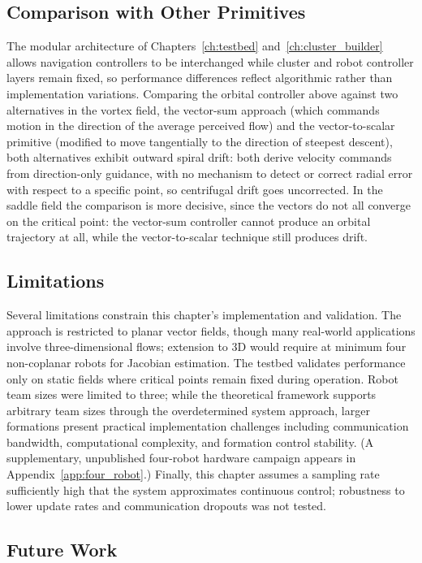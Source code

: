 \documentclass[12pt, letterpaper, oneside]{report}
\begin{document}
\subsection{Comparison with Other Primitives}

The modular architecture of Chapters~\ref{ch:testbed}
and~\ref{ch:cluster_builder} allows navigation controllers to be
interchanged while cluster and robot controller layers remain fixed, so
performance differences reflect algorithmic rather than implementation
variations. Comparing the orbital controller above against two
alternatives in the vortex field, the vector-sum approach (which commands
motion in the direction of the average perceived flow) and the
vector-to-scalar primitive (modified to move tangentially to the direction
of steepest descent), both alternatives exhibit outward spiral drift: both
derive velocity commands from direction-only guidance, with no mechanism to
detect or correct radial error with respect to a specific point, so
centrifugal drift goes uncorrected. In the saddle field the comparison is
more decisive, since the vectors do not all converge on the critical point:
the vector-sum controller cannot produce an orbital trajectory at all,
while the vector-to-scalar technique still produces drift.

\subsection{Limitations}

Several limitations constrain this chapter's implementation and validation.
The approach is restricted to planar vector fields, though many real-world
applications involve three-dimensional flows; extension to 3D would require
at minimum four non-coplanar robots for Jacobian estimation. The testbed
validates performance only on static fields where critical points remain
fixed during operation. Robot team sizes were limited to three; while the
theoretical framework supports arbitrary team sizes through the
overdetermined system approach, larger formations present practical
implementation challenges including communication bandwidth, computational
complexity, and formation control stability. (A supplementary, unpublished
four-robot hardware campaign appears in Appendix~\ref{app:four_robot}.)
Finally, this chapter assumes a sampling rate sufficiently high that the
system approximates continuous control; robustness to lower update rates
and communication dropouts was not tested.

\subsection{Future Work}
\label{sec:vf_future_work}
\end{document}
